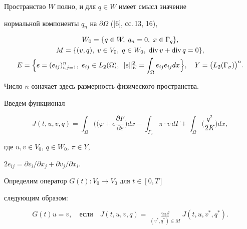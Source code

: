 Пространство $W$ полно, и для $q \in W$ имеет смысл значение


нормальной компоненты $q_{n}$ на $\partial \Omega$ ([6], сс.\,13, 16),


\begin{gather*}


W_{0}= \{ q \in W, \; q_{n}=0, \; x \in \Gamma_{q}\},\\


M= \{ (v,q), \; v \in V_{0},\; q \in W_{0},\; \Div v+ \Div q =0\},\\


E= \Bigl \{ e=(e_{ij})^{n}_{i,j=1}, \;


e_{ij} \in L_{2}(\Omega), \;


\|e \|^{2}_{E}= \int_{\Omega} e_{ij} e_{ij} dx \Bigr \},\quad


Y= \bigl ( L_{2}(\Gamma_{ \sigma}) \bigr )^{n}.


\end{gather*}


Число $n$ означает здесь размерность физического пространства.





Введем функционал


\begin{equation}


J(t,u,v,q)= \int_{\Omega}\biggl(


(\varphi + e \frac{\partial F}{\partial \varepsilon}\biggr)dx-


\int_{\Gamma_{\sigma}} \pi \cdot v \, d\Gamma+


\int_{\Omega}


\biggl ( \frac{q^{2}}{2 K} \biggr ) dx,


\end{equation}


где $u,v \in V_{0}$, $q \in W_{0}$, $\pi \in Y$,


$2e_{ij}=\partial v_i/\partial x_j+\partial v_j/\partial x_i$.


Определим оператор $G(t): V_{0} \to V_{0}$ для $t \in [0,T]$


следующим образом:


\begin{equation}


G(t) u = v, \quad \text{если} \quad


J(t,u,v,q)=\inf_{ (v^{*},q^{*}) \in M} J(t,u,v^{*},q^{*}).


\end{equation}


